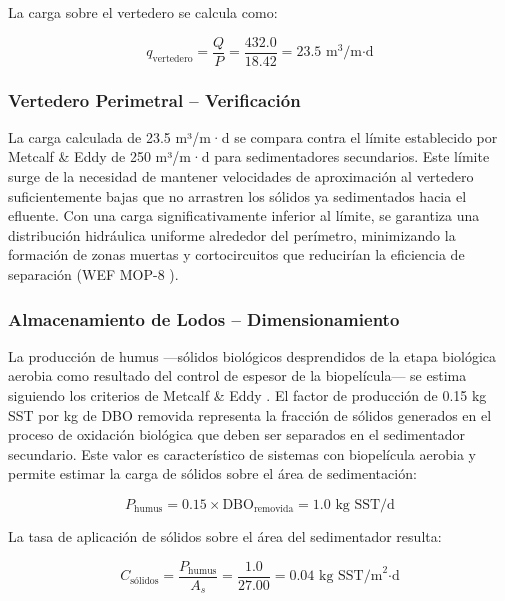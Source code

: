 \documentclass[12pt,a4paper]{article}
\begin{document}
La carga sobre el vertedero se calcula como:

\begin{equation}
q_{\text{vertedero}} = \frac{Q}{P} = \frac{432.0}{18.42} = 23.5 \text{ m}^3\text{/m·d}
\end{equation}

\subsubsection{Vertedero Perimetral -- Verificación}

La carga calculada de 23.5 m³/m·d se compara contra el límite establecido por Metcalf \& Eddy \cite{metcalf2014} de 250 m³/m·d para sedimentadores secundarios. Este límite surge de la necesidad de mantener velocidades de aproximación al vertedero suficientemente bajas que no arrastren los sólidos ya sedimentados hacia el efluente. Con una carga significativamente inferior al límite, se garantiza una distribución hidráulica uniforme alrededor del perímetro, minimizando la formación de zonas muertas y cortocircuitos que reducirían la eficiencia de separación (WEF MOP-8 \cite{wef_mop8_2010}).

\subsubsection{Almacenamiento de Lodos -- Dimensionamiento}

La producción de humus —sólidos biológicos desprendidos de la etapa biológica aerobia como resultado del control de espesor de la biopelícula— se estima siguiendo los criterios de Metcalf \& Eddy \cite{metcalf2014}. El factor de producción de 0.15 kg SST por kg de DBO removida representa la fracción de sólidos generados en el proceso de oxidación biológica que deben ser separados en el sedimentador secundario. Este valor es característico de sistemas con biopelícula aerobia y permite estimar la carga de sólidos sobre el área de sedimentación:

\begin{equation}
P_{\text{humus}} = 0.15 \times \text{DBO}_{\text{removida}} = 1.0 \text{ kg SST/d}
\end{equation}

La tasa de aplicación de sólidos sobre el área del sedimentador resulta:

\begin{equation}
C_{\text{sólidos}} = \frac{P_{\text{humus}}}{A_s} = \frac{1.0}{27.00} = 0.04 \text{ kg SST/m}^2\text{·d}
\end{equation}
\end{document}
